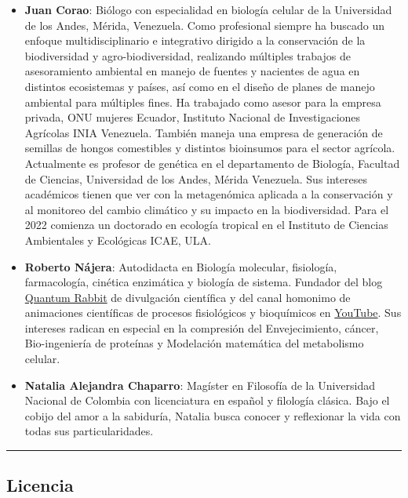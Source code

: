 \documentclass[
  12pt, krantz2,
  spanish,
]{krantz}
\begin{document}
\begin{itemize}
\item
  \textbf{Juan Corao}: Biólogo con especialidad en biología celular de la Universidad de los Andes, Mérida, Venezuela. Como profesional siempre ha buscado un enfoque multidisciplinario e integrativo dirigido a la conservación de la biodiversidad y agro-biodiversidad, realizando múltiples trabajos de asesoramiento ambiental en manejo de fuentes y nacientes de agua en distintos ecosistemas y países, así como en el diseño de planes de manejo ambiental para múltiples fines. Ha trabajado como asesor para la empresa privada, ONU mujeres Ecuador, Instituto Nacional de Investigaciones Agrícolas INIA Venezuela. También maneja una empresa de generación de semillas de hongos comestibles y distintos bioinsumos para el sector agrícola. Actualmente es profesor de genética en el departamento de Biología, Facultad de Ciencias, Universidad de los Andes, Mérida Venezuela. Sus intereses académicos tienen que ver con la metagenómica aplicada a la conservación y al monitoreo del cambio climático y su impacto en la biodiversidad. Para el 2022 comienza un doctorado en ecología tropical en el Instituto de Ciencias Ambientales y Ecológicas ICAE, ULA.
\item
  \textbf{Roberto Nájera}: Autodidacta en Biología molecular, fisiología, farmacología, cinética enzimática y biología de sistema. Fundador del blog \href{https://www.facebook.com/Medicina88}{Quantum Rabbit} de divulgación científica y del canal homonimo de animaciones científicas de procesos fisiológicos y bioquímicos en \href{https://www.youtube.com/channel/UC21O3WpoUEXuu6ZmvkFHOCA}{YouTube}. Sus intereses radican en especial en la compresión del Envejecimiento, cáncer, Bio-ingeniería de proteínas y Modelación matemática del metabolismo celular.
\item
  \textbf{Natalia Alejandra Chaparro}: Magíster en Filosofía de la Universidad Nacional de Colombia con licenciatura en español y filología clásica. Bajo el cobijo del amor a la sabiduría, Natalia busca conocer y reflexionar la vida con todas sus particularidades.
\end{itemize}

\begin{center}\rule{0.5\linewidth}{0.5pt}\end{center}

\hypertarget{licencia}{%
\subsection*{Licencia}\label{licencia}}
\end{document}
